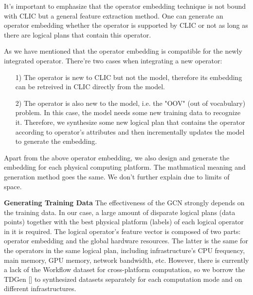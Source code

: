 It's important to emphasize that the operator embedding technique is not bound with CLIC but a general feature extraction method. 
One can generate an operator embedding whether the operator is supported by CLIC or not as long as there are logical plans that contain this operator.

As we have mentioned that the operator embedding is compatible for the newly integrated operator. 
There're two cases when integrating a new operator:
\begin{itemize}
    \item [1)]
    The operator is new to CLIC but not the model, therefore its embedding can be retreived in CLIC directly from the model.
    \item [2)]
    The operator is also new to the model, i.e. the "OOV" (out of vocabulary) problem. 
    In this case, the model needs some new training data to recognize it. 
    Therefore, we synthesize some new logical plan that contains the operator according to operator's attributes and then incrementally updates the model to generate the embedding.
\end{itemize}

Apart from the above operator embedding, 
we also design and generate the embedding for each physical computing platform. 
The mathmatical meaning and generation method goes the same. 
We don't further explain due to limits of space.


\textbf{Generating Training Data}
The effectiveness of the GCN strongly depends on the training data. 
In our case, a large amount of disparate logical plans (data points) together with the best physical platform (labels) of each logical operator in it is required. 
The logical operator's feature vector is composed of two parts: operator embedding and the global hardware resources. 
The latter is the same for the operators in the same logical plan, including infrastructure's CPU frequency, main memory, GPU memory, network bandwidth, etc. 
However, there is currently a lack of the Workflow dataset for cross-platform computation, so we borrow the TDGen [] to synthesized datasets separately for each computation mode and on different infrastructures.